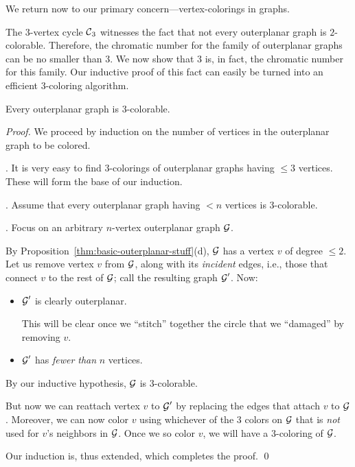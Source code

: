 \medskip

We return now to our primary concern---vertex-colorings in graphs.

\medskip

The $3$-vertex cycle $\mbox{$\cal C$}_3$ witnesses the fact that not every outerplanar graph is $2$-colorable. Therefore, the chromatic number for the family of outerplanar graphs can be no smaller than $3$.  We now show that $3$ is, in fact, the chromatic number for this family.  Our inductive proof of this fact can easily be turned into an efficient $3$-coloring algorithm.

\begin{prop}
\label{thm:OP-3-colorability}
Every outerplanar graph is $3$-colorable.
\end{prop}

\begin{proof}
We proceed by induction on the number of vertices in the outerplanar graph to be colored.

\smallskip

.
It is very easy to find $3$-colorings of outerplanar graphs having $\leq 3$ vertices.  These will form the base of our induction.

\medskip

.
Assume that every outerplanar graph having $< n$ vertices is $3$-colorable.

\medskip

.
Focus on an arbitrary $n$-vertex outerplanar graph $\mbox{$\cal G$}$.

\smallskip


By Proposition~\ref{thm:basic-outerplanar-stuff}(d), $\mbox{$\cal G$}$ has a vertex $v$ of degree $\leq 2$.  Let us remove vertex $v$ from $\mbox{$\cal G$}$, along with its {\it incident} edges, i.e., those that connect $v$ to the rest of $\mbox{$\cal G$}$; call the resulting graph $\mbox{$\cal G$}'$.  Now: 
\begin{itemize}
\item
$\mbox{$\cal G$}'$ is clearly outerplanar.

\smallskip

This will be clear once we ``stitch'' together the circle that we ``damaged'' by removing $v$.
\medskip\item
$\mbox{$\cal G$}'$ has {\em fewer than} $n$ vertices.
\end{itemize}
By our inductive hypothesis, $\mbox{$\cal G$}$ is $3$-colorable.

\smallskip

But now we can reattach vertex $v$ to $\mbox{$\cal G$}'$ by replacing the edges that attach $v$ to $\mbox{$\cal G$}$. Moreover, we can now color $v$ using whichever of the $3$ colors on $\mbox{$\cal G$}$ that is {\em not} used for $v$'s neighbors in $\mbox{$\cal G$}$.  Once we so color $v$, we will have a $3$-coloring of $\mbox{$\cal G$}$.

\smallskip

Our induction is, thus extended, which completes the proof.  \qed
\end{proof}


